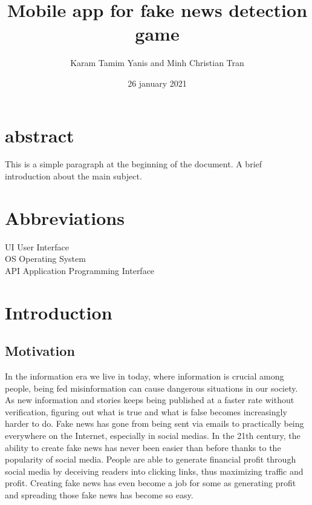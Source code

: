 \documentclass[12pt, letterpaper, twoside]{article}
\title{Mobile app for fake news detection game}
\author{Karam Tamim Yanis and Minh Christian Tran}
\date{26 january 2021}
\begin{document}
\begin{titlepage}
\maketitle
\thispagestyle{empty}%
\end{titlepage}

\section*{abstract}
This is a simple paragraph at the beginning of the 
document. A brief introduction about the main subject.
\clearpage

\section*{Abbreviations}
UI User Interface\\
OS Operating System\\
API Application Programming Interface
\clearpage


\tableofcontents
\thispagestyle{empty}%
\cleardoublepage%

\setcounter{page}{1}%

\section{Introduction}
\subsection{Motivation}
In the information era we live in today, where information is crucial among people, being fed misinformation can cause dangerous situations in our society. As new information and stories keeps being published at a faster rate without verification, figuring out what is true and what is false becomes increasingly harder to do. Fake news has gone from being sent via emails to practically being everywhere on the Internet, especially in social medias. In the 21th century, the ability to create fake news has never been easier than before thanks to the popularity of social media. People are able to generate financial profit through social media by deceiving readers into clicking links, thus maximizing traffic and profit. Creating fake news has even become a job for some as generating profit and spreading those fake news has become so easy. \\ %
\end{document}
